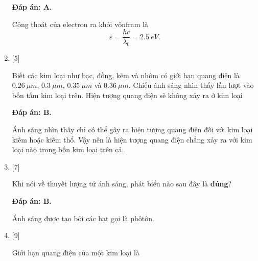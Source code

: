 \begin{enumerate}[label=\bfseries Câu \arabic*:]
	\loigiai
	{		\textbf{Đáp án: A.}
		
		Công thoát của electron ra khỏi vônfram là 
		$$
		\varepsilon = \dfrac{hc}{\lambda_{0}} = \SI{2,5}{eV}.
		$$
	}
	
	\item {} [5]
		\cauhoi
	{Biết các kim loại như bạc, đồng, kẽm và nhôm có giới hạn quang điện là $\SI{0,26}{\mu m}$, $\SI{0,3}{\mu m}$, $\SI{0,35}{\mu m}$ và $\SI{0,36}{\mu m}$. Chiếu ánh sáng nhìn thấy lần lượt vào bốn tấm kim loại trên. Hiện tượng quang điện sẽ không xảy ra ở kim loại
	}
	
	\loigiai
	{		\textbf{Đáp án: B.}
		
		Ánh sáng nhìn thấy chỉ có thể gây ra hiện tượng quang điện đối với kim loại kiềm hoặc kiềm thổ. Vậy nên là hiện tượng quang điện chẳng xảy ra với kim loại nào trong bốn kim loại trên cả.
	}
	
	\item {} [7]
	\cauhoi
	{ Khi nói về thuyết lượng tử ánh sáng, phát biểu nào sau đây là \textbf{ đúng}?
	}
	
	\loigiai
	{		\textbf{Đáp án: B.}
		
		Ánh sáng được tạo bởi các hạt gọi là phôtôn.
	}
	
	\item {} [9]
	\cauhoi
	{Giới hạn quang điện của một kim loại là
	}
	

\end{enumerate}
